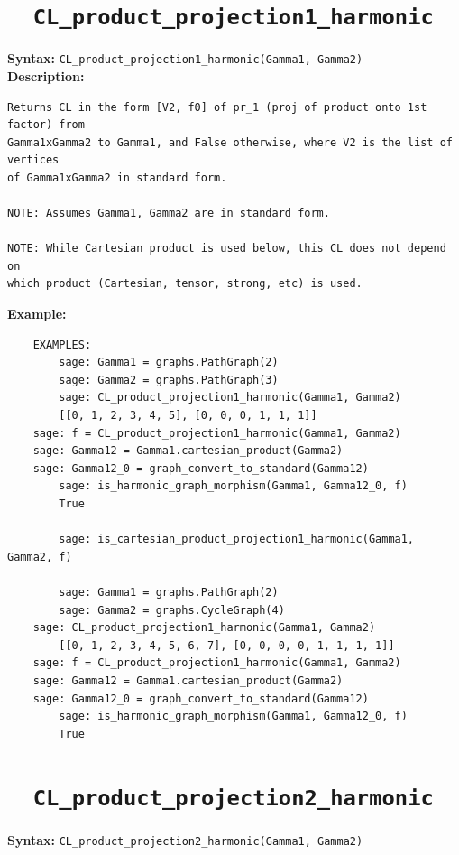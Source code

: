 \documentclass{article}
\begin{document}
\section{\tt \ \ CL\_product\_projection1\_harmonic}

\textbf{Syntax:} \verb}CL_product_projection1_harmonic(Gamma1, Gamma2)}\\

\textbf{Description:}
\begin{verbatim}
Returns CL in the form [V2, f0] of pr_1 (proj of product onto 1st factor) from 
Gamma1xGamma2 to Gamma1, and False otherwise, where V2 is the list of vertices
of Gamma1xGamma2 in standard form.

NOTE: Assumes Gamma1, Gamma2 are in standard form.

NOTE: While Cartesian product is used below, this CL does not depend on
which product (Cartesian, tensor, strong, etc) is used.
\end{verbatim}

\textbf{Example:}
\begin{verbatim}
    EXAMPLES:
        sage: Gamma1 = graphs.PathGraph(2)
        sage: Gamma2 = graphs.PathGraph(3)
        sage: CL_product_projection1_harmonic(Gamma1, Gamma2) 
        [[0, 1, 2, 3, 4, 5], [0, 0, 0, 1, 1, 1]]
	sage: f = CL_product_projection1_harmonic(Gamma1, Gamma2)
	sage: Gamma12 = Gamma1.cartesian_product(Gamma2)
	sage: Gamma12_0 = graph_convert_to_standard(Gamma12)  
        sage: is_harmonic_graph_morphism(Gamma1, Gamma12_0, f) 
        True

        sage: is_cartesian_product_projection1_harmonic(Gamma1, Gamma2, f) 

        sage: Gamma1 = graphs.PathGraph(2) 
        sage: Gamma2 = graphs.CycleGraph(4)
	sage: CL_product_projection1_harmonic(Gamma1, Gamma2) 
        [[0, 1, 2, 3, 4, 5, 6, 7], [0, 0, 0, 0, 1, 1, 1, 1]]
	sage: f = CL_product_projection1_harmonic(Gamma1, Gamma2)
	sage: Gamma12 = Gamma1.cartesian_product(Gamma2)
	sage: Gamma12_0 = graph_convert_to_standard(Gamma12)  
        sage: is_harmonic_graph_morphism(Gamma1, Gamma12_0, f) 
        True
\end{verbatim}

\section{\tt \ \ CL\_product\_projection2\_harmonic}

\textbf{Syntax:} \verb}CL_product_projection2_harmonic(Gamma1, Gamma2)}\\
\end{document}
